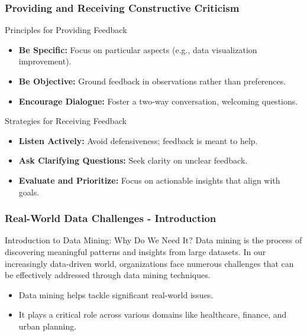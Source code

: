 \documentclass[aspectratio=169]{beamer}
\begin{document}
\begin{frame}[fragile]
    \frametitle{Providing and Receiving Constructive Criticism}
    \begin{block}{Principles for Providing Feedback}
        \begin{itemize}
            \item \textbf{Be Specific:} Focus on particular aspects (e.g., data visualization improvement).
            \item \textbf{Be Objective:} Ground feedback in observations rather than preferences.
            \item \textbf{Encourage Dialogue:} Foster a two-way conversation, welcoming questions.
        \end{itemize}
    \end{block}
    
    \begin{block}{Strategies for Receiving Feedback}
        \begin{itemize}
            \item \textbf{Listen Actively:} Avoid defensiveness; feedback is meant to help.
            \item \textbf{Ask Clarifying Questions:} Seek clarity on unclear feedback.
            \item \textbf{Evaluate and Prioritize:} Focus on actionable insights that align with goals.
        \end{itemize}
    \end{block}
\end{frame}

\begin{frame}[fragile]
    \frametitle{Real-World Data Challenges - Introduction}
    \begin{block}{Introduction to Data Mining: Why Do We Need It?}
        Data mining is the process of discovering meaningful patterns and insights from large datasets. 
        In our increasingly data-driven world, organizations face numerous challenges that can be effectively 
        addressed through data mining techniques.
    \end{block}
    
    \begin{itemize}
        \item Data mining helps tackle significant real-world issues.
        \item It plays a critical role across various domains like healthcare, finance, and urban planning.
    \end{itemize}
\end{frame}
\end{document}

